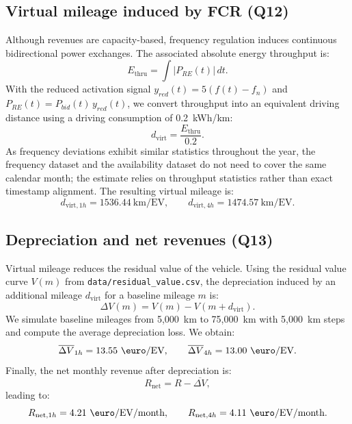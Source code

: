 \documentclass{article}
\begin{document}
\subsection{Virtual mileage induced by FCR (Q12)}
Although revenues are capacity-based, frequency regulation induces continuous bidirectional power exchanges. The associated absolute energy throughput is:
\begin{equation}
    E_{\text{thru}} = \int |P_{RE}(t)|\,dt.
\end{equation}
With the reduced activation signal $y_{red}(t)=5(f(t)-f_n)$ and $P_{RE}(t)=P_{bid}(t)\,y_{red}(t)$, we convert throughput into an equivalent driving distance using a driving consumption of 0.2~kWh/km:
\begin{equation}
    d_{\text{virt}} = \frac{E_{\text{thru}}}{0.2}.
\end{equation}
As frequency deviations exhibit similar statistics throughout the year, the frequency dataset and the availability dataset do not need to cover the same calendar month; the estimate relies on throughput statistics rather than exact timestamp alignment.
The resulting virtual mileage is:
\begin{equation}
    d_{\text{virt},1h}=1536.44~\text{km/EV}, \qquad
    d_{\text{virt},4h}=1474.57~\text{km/EV}.
\end{equation}

\subsection{Depreciation and net revenues (Q13)}
Virtual mileage reduces the residual value of the vehicle. Using the residual value curve $V(m)$ from \texttt{data/residual\_value.csv}, the depreciation induced by an additional mileage $d_{\text{virt}}$ for a baseline mileage $m$ is:
\begin{equation}
    \Delta V(m) = V(m) - V(m + d_{\text{virt}}).
\end{equation}
We simulate baseline mileages from 5,000~km to 75,000~km with 5,000~km steps and compute the average depreciation loss. We obtain:
\begin{equation}
    \overline{\Delta V}_{1h}=13.55~\text{\euro/EV}, \qquad
    \overline{\Delta V}_{4h}=13.00~\text{\euro/EV}.
\end{equation}
Finally, the net monthly revenue after depreciation is:
\begin{equation}
    R_{\text{net}} = R - \overline{\Delta V},
\end{equation}
leading to:
\begin{equation}
    R_{\text{net},1h}=4.21~\text{\euro/EV/month}, \qquad
    R_{\text{net},4h}=4.11~\text{\euro/EV/month}.
\end{equation}
\end{document}
